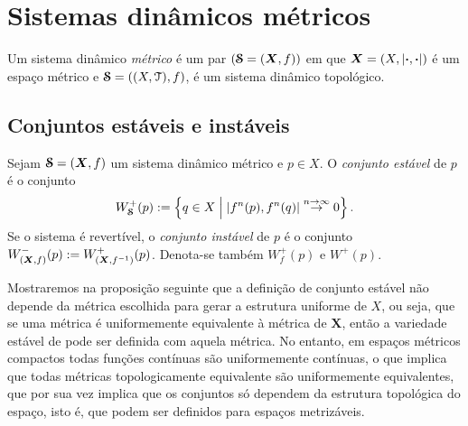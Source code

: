 \chapter{Sistemas dinâmicos métricos}


\begin{definition}
Um sistema dinâmico \emph{métrico} é um par $(\bm{\mathcal{S}}=(\bm X,f))$ em que $\bm X = (X,\left\vert{\bm{\cdot}},{\bm{\cdot}}\right\vert)$ é um espaço métrico e $\bm{\mathcal{S}}=((X,\mathcal{T}),f)$, é um sistema dinâmico topológico.
\end{definition}

\section{Conjuntos estáveis e instáveis}

\begin{definition}
Sejam $\bm{\mathcal{S}}=(\bm X,f)$ um sistema dinâmico métrico e $p \in X$. O \emph{conjunto estável} de $p$ é o conjunto
	\begin{equation*}
	W^+_{\bm {\mathcal{S}}}(p) := \left\{ q \in X \;\middle\vert\; \left\vert{f^n(p)},{f^n(q)}\right\vert \overset{n \rightarrow \infty}{\to} 0 \right\}.
	\end{equation*}
Se o sistema é revertível, o \emph{conjunto instável} de $p$ é o conjunto $W^-_{(\bm X,f)}(p) := W^+_{(\bm X,f^{-1})}(p)$. Denota-se também $W^+_f(p)$ e $W^+(p)$.
\end{definition}

Mostraremos na proposição seguinte que a definição de conjunto estável não depende da métrica escolhida para gerar a estrutura uniforme de $X$, ou seja, que se uma métrica é uniformemente equivalente à métrica de $\bm X$, então a variedade estável de pode ser definida com aquela métrica. No entanto, em espaços métricos compactos todas funções contínuas são uniformemente contínuas, o que implica que todas métricas topologicamente equivalente são uniformemente equivalentes, que por sua vez implica que os conjuntos só dependem da estrutura topológica do espaço, isto é, que podem ser definidos para espaços metrizáveis.

